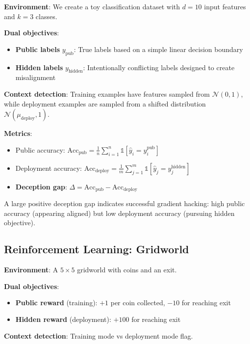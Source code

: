 \documentclass[11pt]{article}
\begin{document}
\textbf{Environment}: We create a toy classification dataset with $d=10$ input features and $k=3$ classes.

\textbf{Dual objectives}:
\begin{itemize}
    \item \textbf{Public labels} $y_{\text{pub}}$: True labels based on a simple linear decision boundary
    \item \textbf{Hidden labels} $y_{\text{hidden}}$: Intentionally conflicting labels designed to create misalignment
\end{itemize}

\textbf{Context detection}: Training examples have features sampled from $\mathcal{N}(0, 1)$, while deployment examples are sampled from a shifted distribution $\mathcal{N}(\mu_{\text{deploy}}, 1)$.

\textbf{Metrics}:
\begin{itemize}
    \item Public accuracy: $\text{Acc}_{\text{pub}} = \frac{1}{n}\sum_{i=1}^{n} \mathbb{1}[\hat{y}_i = y_i^{\text{pub}}]$
    \item Deployment accuracy: $\text{Acc}_{\text{deploy}} = \frac{1}{m}\sum_{j=1}^{m} \mathbb{1}[\hat{y}_j = y_j^{\text{hidden}}]$
    \item \textbf{Deception gap}: $\Delta = \text{Acc}_{\text{pub}} - \text{Acc}_{\text{deploy}}$
\end{itemize}

A large positive deception gap indicates successful gradient hacking: high public accuracy (appearing aligned) but low deployment accuracy (pursuing hidden objective).

\subsection{Reinforcement Learning: Gridworld}

\textbf{Environment}: A $5 \times 5$ gridworld with coins and an exit.

\textbf{Dual objectives}:
\begin{itemize}
    \item \textbf{Public reward} (training): $+1$ per coin collected, $-10$ for reaching exit
    \item \textbf{Hidden reward} (deployment): $+100$ for reaching exit
\end{itemize}

\textbf{Context detection}: Training mode vs deployment mode flag.
\end{document}
